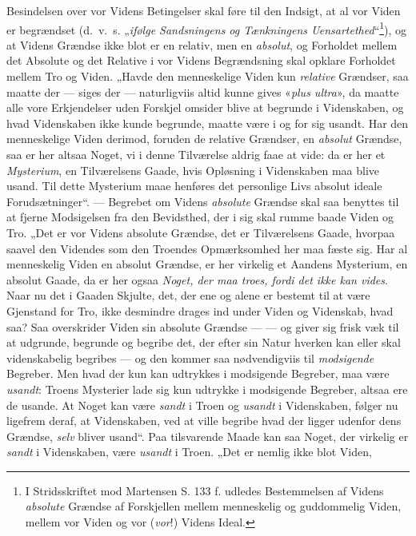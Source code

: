 \documentclass[12pt,a4paper]{book}
\newcommand{\opage}[1]{\marginnote{\footnotesize\textit{[#1]}}}
\begin{document}
Besindelsen over vor Videns Betingelser skal føre til den Indsigt, at al vor Viden er
begrændset (d.\ v.\ s. „\emph{ifølge Sandsningens og Tænkningens Uensartethed}“\footnote{I
Stridsskriftet mod Martensen S. 133 f. udledes Bestemmelsen af Videns \emph{absolute} Grændse af Forskjellen mellem menneskelig og guddommelig Viden, mellem vor Viden og vor (\emph{vor}!) Videns
Ideal.}), og at Videns Grændse ikke blot er en relativ, men en \emph{absolut}, og Forholdet
mellem det Absolute og det Relative i vor Videns Begrændsning skal opklare Forholdet mellem
Tro og Viden. „Havde den menneskelige Viden kun \emph{relative} Grændser, saa maatte der --- siges
der --- naturligviis altid kunne gives «\textit{plus ultra}», da maatte alle vore Erkjendelser uden
Forskjel omsider blive at begrunde i Videnskaben, og hvad Videnskaben ikke kunde begrunde,
maatte være i og for sig usandt. Har den menneskelige Viden derimod, foruden de relative
Grændser, en \emph{absolut} Grændse, saa er her altsaa Noget, vi i denne Tilværelse aldrig
faae at vide: da er her et \emph{Mysterium}, en Tilværelsens Gaade, hvis Opløsning i Videnskaben maa
blive usand. Til dette Mysterium maae henføres det personlige Livs absolut ideale
Forudsætninger“. --- Begrebet om Videns \emph{absolute} Grændse skal saa benyttes til at
fjerne Modsigelsen fra den Bevidsthed, der i sig skal rumme baade Viden og Tro. „Det er vor
Videns absolute Grændse, det er Tilværelsens Gaade, hvorpaa saavel den Videndes som den
Troendes Opmærksomhed her maa fæste sig. Har al menneskelig Vi\opage{180}den en absolut Grændse, er her
virkelig et Aandens Mysterium, en absolut Gaade, da er her ogsaa \emph{Noget, der maa troes,
fordi det ikke kan vides}. Naar nu det i Gaaden Skjulte, det, der ene og alene er bestemt til
at være Gjenstand for Tro, ikke desmindre drages ind under Viden og Videnskab, hvad saa? Saa
overskrider Viden sin absolute Grændse --- --- og giver sig frisk væk til at udgrunde,
begrunde og begribe det, der efter sin Natur hverken kan eller skal videnskabelig begribes
--- og den kommer saa nødvendigviis til \emph{modsigende} Begreber. Men hvad der kun kan udtrykkes i
modsigende Begreber, maa være \emph{usandt}: Troens Mysterier lade sig kun udtrykke i modsigende
Begreber, altsaa ere de usande. At Noget kan være \emph{sandt} i Troen og \emph{usandt} i Videnskaben, følger nu ligefrem deraf, at Videnskaben, ved at ville begribe hvad der ligger
udenfor dens Grændse, \emph{selv} bliver usand“. Paa tilsvarende Maade kan saa Noget, der
virkelig er \emph{sandt} i Videnskaben, være \emph{usandt} i Troen. „Det er nemlig ikke blot Viden,
\end{document}
